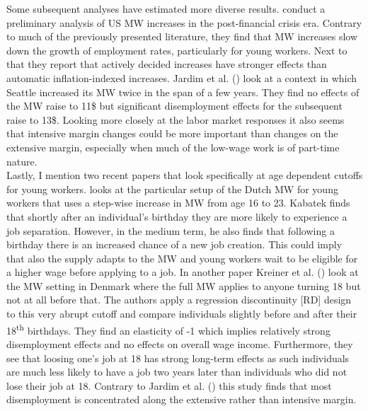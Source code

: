 \documentclass[11pt]{scrartcl}
\begin{document}
Some subsequent analyses have estimated more diverse results. \textcite{StrainMW2017} conduct a preliminary analysis of US MW increases in the post-financial crisis era. Contrary to much of the previously presented literature, they find that MW increases slow down the growth of employment rates, particularly for young workers. Next to that they report that actively decided increases have stronger effects than automatic inflation-indexed increases. Jardim et al. (\citeyear{JardimMWSeattle2017}) look at a context in which Seattle increased its MW twice in the span of a few years. They find no effects of the MW raise to 11\$ but significant disemployment effects for the subsequent raise to 13\$. Looking more closely at the labor market responses it also seems that intensive margin changes could be more important than changes on the extensive margin, especially when much of the low-wage work is of part-time nature. \\

Lastly, I mention two recent papers that look specifically at age dependent cutoffs for young workers. \textcite{KabatekBirthday2020} looks at the particular setup of the Dutch MW for young workers that uses a step-wise increase in MW from age 16 to 23. Kabatek finds that shortly after an individual's birthday they are more likely to experience a job separation. However, in the medium term, he also finds that following a birthday there is an increased chance of a new job creation. This could imply that also the supply adapts to the MW and young workers wait to be eligible for a higher wage before applying to a job. In another paper Kreiner et al. (\citeyear{KreinerReckMW2020}) look at the MW setting in Denmark where the full MW applies to anyone turning 18 but not at all before that. The authors apply a regression discontinuity [RD] design to this very abrupt cutoff and compare individuals slightly before and after their 18\textsuperscript{th} birthdays. They find an elasticity of -1 which implies relatively strong disemployment effects and no effects on overall wage income. Furthermore, they see that loosing one's job at 18 has strong long-term effects as such individuals are much less likely to have a job two years later than individuals who did not lose their job at 18. Contrary to Jardim et al. (\citeyear{JardimMWSeattle2017}) this study finds that most disemployment is concentrated along the extensive rather than intensive margin. \\
\end{document}
